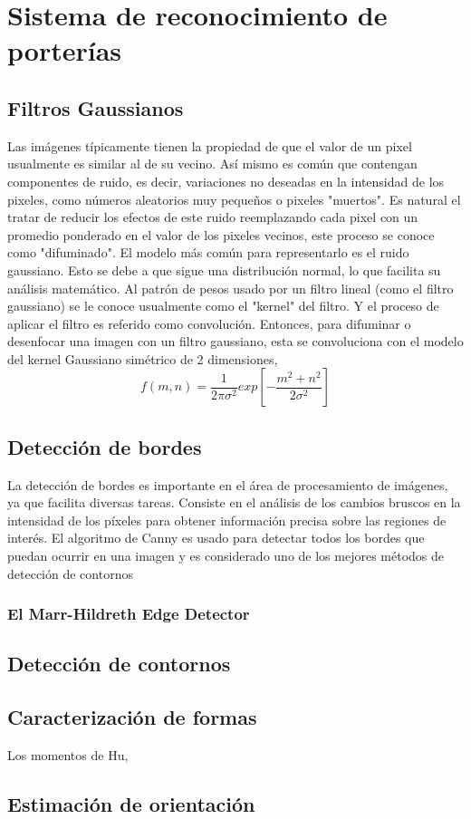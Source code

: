 \chapter{Sistema de reconocimiento de porterías}\label{sec:porteria}

\section{Filtros Gaussianos}
Las imágenes típicamente tienen la propiedad de que el valor de un pixel usualmente es similar al de su vecino. Así mismo es común que contengan componentes de ruido, es decir, variaciones no deseadas en la intensidad de los pixeles, como números aleatorios muy pequeños o pixeles "muertos". Es natural el tratar de reducir los efectos de este ruido reemplazando cada pixel con un promedio ponderado en el valor de los pixeles vecinos, este proceso se conoce como "difuminado".  El modelo más común para representarlo es el ruido gaussiano. Esto se debe a que sigue una distribución normal, lo que facilita su análisis matemático. Al patrón de pesos usado por un filtro lineal (como el filtro gaussiano) se le conoce usualmente como el "kernel" del filtro. Y el proceso de aplicar el filtro es referido como convolución.\cite{forsyth2002computer} Entonces, para difuminar o desenfocar una imagen con un filtro gaussiano, esta se convoluciona con el modelo del kernel Gaussiano simétrico de 2 dimensiones, 
\begin{equation}
\label{eq:pythagorean}
f(m,n)=\frac{1}{2\pi \sigma^2}exp[-\frac{m^2+n^2}{2\sigma^2} ]
\end{equation}
\section{Detección de bordes}
La detección de bordes es importante en el área de procesamiento de imágenes, ya que facilita diversas tareas. Consiste en el análisis de los cambios bruscos en la intensidad de los píxeles para obtener información precisa sobre las regiones de interés.\cite{rebaza2007deteccion} El algoritmo de Canny es usado para detectar todos los bordes que puedan ocurrir en una imagen y es considerado uno de los mejores métodos de detección de contornos \\

\subsection{El Marr-Hildreth Edge Detector\\}
\section{Detección de contornos}

\section{Caracterización de formas}
Los momentos de Hu, 

\section{Estimación de orientación}